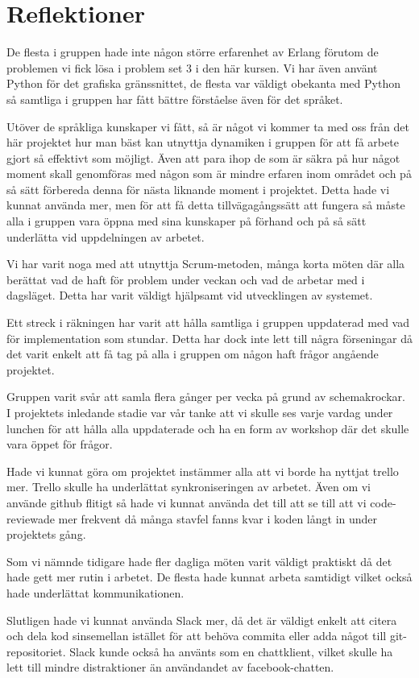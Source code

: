 \chapter{Reflektioner}

\label{Reflektioner} 


De flesta i gruppen hade inte någon större erfarenhet av Erlang förutom de problemen vi fick lösa i problem set 3 i den här kursen. Vi har även använt Python för det grafiska gränssnittet, de flesta var väldigt obekanta med Python så samtliga i gruppen har fått bättre förståelse även för det språket.

Utöver de språkliga kunskaper vi fått, så är något vi kommer ta med oss från det här projektet hur man bäst kan utnyttja dynamiken i gruppen för att få arbete gjort så effektivt som möjligt. Även att para ihop de som är säkra på hur något moment skall genomföras med någon som är mindre erfaren inom området och på så sätt förbereda denna för nästa liknande moment i projektet. Detta hade vi kunnat använda mer, men för att få detta tillvägagångssätt att fungera så måste alla i gruppen vara öppna med sina kunskaper på förhand och på så sätt underlätta vid uppdelningen av arbetet.

Vi har varit noga med att utnyttja Scrum-metoden, många korta möten där alla berättat vad de haft för problem under veckan och vad de arbetar med i dagsläget. Detta har varit väldigt hjälpsamt vid utvecklingen av systemet.

Ett streck i räkningen har varit att hålla samtliga i gruppen uppdaterad med vad för implementation som stundar. Detta har dock inte lett till några förseningar då det varit enkelt att få tag på alla i gruppen om någon haft frågor angående projektet. 

Gruppen varit svår att samla flera gånger per vecka på grund av schemakrockar. I projektets inledande stadie var vår tanke att vi skulle ses varje vardag under lunchen för att hålla alla uppdaterade och ha en form av workshop där det skulle vara öppet för frågor.

Hade vi kunnat göra om projektet instämmer alla att vi borde ha nyttjat trello mer. Trello skulle ha underlättat synkroniseringen av arbetet. Även om vi använde github flitigt så hade vi kunnat använda det till att se till att vi code-reviewade mer frekvent då många stavfel fanns kvar i koden långt in under projektets gång. 


Som vi nämnde tidigare hade fler dagliga möten varit väldigt praktiskt då det hade gett mer rutin i arbetet. De flesta hade kunnat arbeta samtidigt vilket också hade underlättat kommunikationen.

Slutligen hade vi kunnat använda Slack mer, då det är väldigt enkelt att citera och dela kod sinsemellan istället för att behöva commita eller adda något till git-repositoriet. Slack kunde också ha använts som en chattklient, vilket skulle ha lett till mindre distraktioner än användandet av facebook-chatten.
